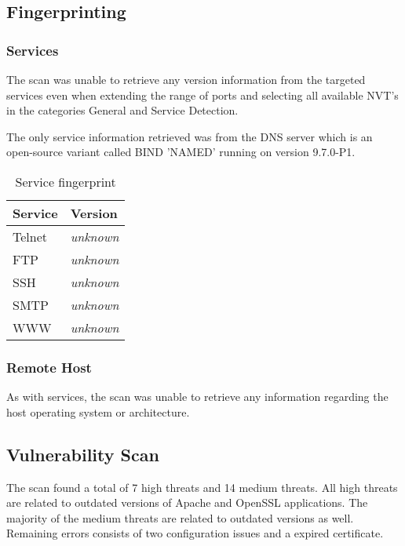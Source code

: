 \subsection{Fingerprinting}


\subsubsection{Services}

The scan was unable to retrieve any version information from the targeted services even when extending the range of ports and selecting all available NVT's in the categories General and Service Detection.

The only service information retrieved was from the DNS server which is an open-source variant called BIND 'NAMED' running on version 9.7.0-P1.

\begin{table}[htb]
 \centering
 \caption{Service fingerprint} \label{tab:service_fingerprint}
 \begin{tabular}{m{2cm}p{5cm}} \toprule
 \textbf{Service} & \textbf{Version} \\ \midrule
 Telnet & \textit{unknown} \\
 FTP & \textit{unknown} \\
 SSH & \textit{unknown} \\
 SMTP & \textit{unknown} \\
 WWW & \textit{unknown} \\ \bottomrule
 \end{tabular} 
\end{table}


\subsubsection{Remote Host}

As with services, the scan was unable to retrieve any information regarding the host operating system or architecture.


\subsection{Vulnerability Scan}

The scan found a total of 7 high threats and 14 medium threats. All high threats are related to outdated versions of Apache and OpenSSL applications. The majority of the medium threats are related to outdated versions as well. Remaining errors consists of two configuration issues and a expired certificate.